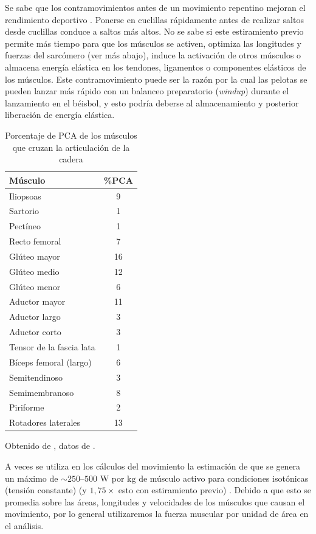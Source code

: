 \documentclass[12pt]{book}
\begin{document}
Se sabe que los contramovimientos antes de un movimiento repentino mejoran el rendimiento deportivo \cite{63}. Ponerse en cuclillas rápidamente antes de realizar saltos desde cuclillas conduce a saltos más altos. No se sabe si este estiramiento previo permite más tiempo para que los músculos se activen, optimiza las longitudes y fuerzas del sarcómero (ver más abajo), induce la activación de otros músculos o almacena energía elástica en los tendones, ligamentos o componentes elásticos de los músculos. Este contramovimiento puede ser la razón por la cual las pelotas se pueden lanzar más rápido con un balanceo preparatorio (\textit{windup}) durante el lanzamiento en el béisbol, y esto podría deberse al almacenamiento y posterior liberación de energía elástica.

\begin{table}[htbp]
\centering
\caption{Porcentaje de PCA de los músculos que cruzan la articulación de la cadera}
\label{tab:51}
\begin{tabularx}{0.6\textwidth}{Xc}
\toprule
\textbf{Músculo} & \textbf{\%PCA} \\
\midrule
Iliopsoas & 9 \\
Sartorio & 1 \\
Pectíneo & 1 \\
Recto femoral & 7 \\
Glúteo mayor & 16 \\
Glúteo medio & 12 \\
Glúteo menor & 6 \\
Aductor mayor & 11 \\
Aductor largo & 3 \\
Aductor corto & 3 \\
Tensor de la fascia lata & 1 \\
Bíceps femoral (largo) & 6 \\
Semitendinoso & 3 \\
Semimembranoso & 8 \\
Piriforme & 2 \\
Rotadores laterales & 13 \\
\bottomrule
\end{tabularx}
\begin{flushleft}
    \small Obtenido de \cite{81}, datos de \cite{76}.
\end{flushleft}
\end{table}

A veces se utiliza en los cálculos del movimiento la estimación de que se genera un máximo de $\sim 250\text{--}500\text{ W}$ por $\text{kg}$ de músculo activo para condiciones isotónicas (tensión constante) (y $1,75\times$ esto con estiramiento previo) \cite{13, 25, 78, 79}. Debido a que esto se promedia sobre las áreas, longitudes y velocidades de los músculos que causan el movimiento, por lo general utilizaremos la fuerza muscular por unidad de área en el análisis.
\end{document}
